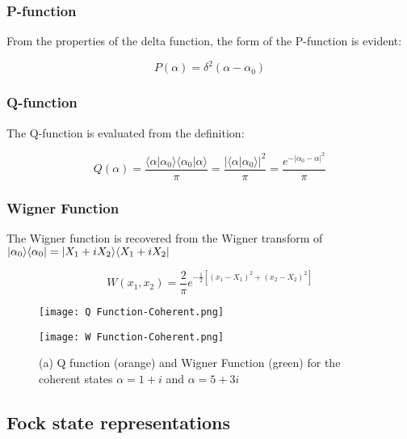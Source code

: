 \subsubsection{P-function}
From the properties of the delta function, the form of the P-function is evident:

\begin{equation}
	P(\alpha) = \delta^2(\alpha-\alpha_0)
\end{equation}

\subsubsection{Q-function}
The Q-function is evaluated from the definition:

\begin{equation}
	Q(\alpha) = \frac{\langle \alpha | \alpha_0 \rangle \langle \alpha_0 | \alpha \rangle}{\pi} = \frac{{|\langle \alpha | \alpha_0 \rangle |}^2}{\pi} =  \frac{e^{-{|\alpha_0 - \alpha |}^2}}{\pi}
\end{equation}

\subsubsection{Wigner Function}
The Wigner function is recovered from the Wigner transform of $| \alpha_0 \rangle\langle\alpha_0 | = | X_1+iX_2 \rangle\langle X_1+iX_2 |$

\begin{equation}
	W(x_1, x_2) = \frac{2}{\pi} e^{-\frac{1}{2}[{(x_1-X_1)}^2+{(x_2-X_2)}^2]}
\end{equation}

\begin{figure}
  \begin{minipage}{0.5\linewidth}
          \texttt{[image: Q Function-Coherent.png]}
	\end{minipage}%
  \begin{minipage}{0.5\linewidth}
          \texttt{[image: W Function-Coherent.png]}
    \end{minipage}
  \caption{(a) Q function (orange) and Wigner Function (green) for the coherent states $\alpha = 1+i$ and $\alpha = 5+3i$}
\end{figure}

\subsection{Fock state representations}

